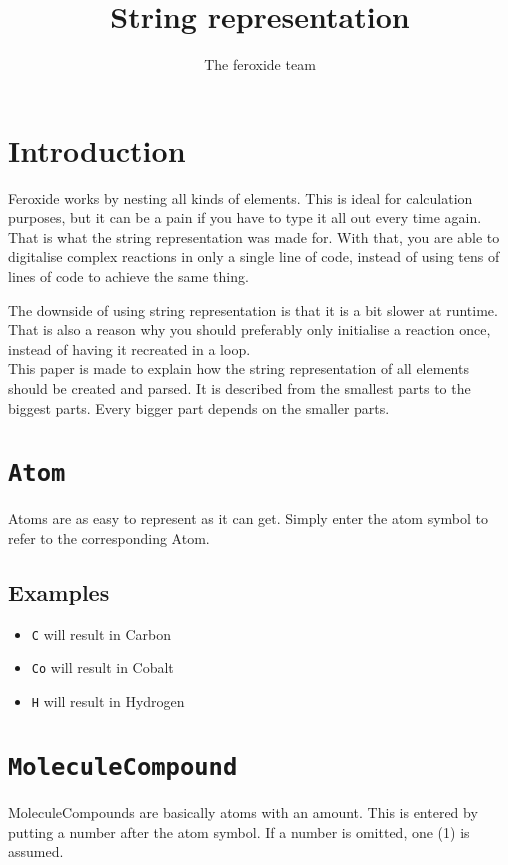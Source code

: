 \documentclass[11pt]{article}
\title{String representation}
\author{The feroxide team}
\def\code#1{\texttt{#1}}
\begin{document}
\maketitle

\section{Introduction}
Feroxide works by nesting all kinds of elements. This is ideal for calculation
purposes, but it can be a pain if you have to type it all out every time again.
That is what the string representation was made for. With that, you are able
to digitalise complex reactions in only a single line of code, instead of
using tens of lines of code to achieve the same thing.

The downside of using string representation is that it is a bit slower at
runtime. That is also a reason why you should preferably only initialise
a reaction once, instead of having it recreated in a loop. \\

This paper is made to explain how the string representation of all
elements should be created and parsed. It is described from the smallest
parts to the biggest parts. Every bigger part depends on the smaller parts.

\newpage

\section{\code{Atom}}
Atoms are as easy to represent as it can get. Simply enter the atom symbol to refer to the corresponding Atom.

\subsection{Examples}
\begin{itemize}
  \item{\code{C} will result in Carbon}
  \item{\code{Co} will result in Cobalt}
  \item{\code{H} will result in Hydrogen}
\end{itemize}


\section{\code{MoleculeCompound}}
MoleculeCompounds are basically atoms with an amount. This is entered by
putting a number after the atom symbol. If a number is omitted, one (1) is assumed.
\end{document}
